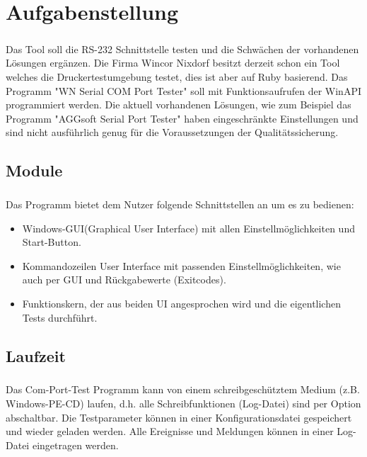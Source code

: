 
\chapter{Aufgabenstellung}\label{chp:aufgabenstellung}
\paragraph{}
Das Tool soll die RS-232 Schnittstelle testen und die Schwächen der vorhandenen Lösungen ergänzen. Die Firma Wincor Nixdorf besitzt derzeit schon ein Tool welches die Druckertestumgebung testet, dies ist aber auf Ruby basierend. Das Programm "WN Serial COM Port Tester" soll mit Funktionsaufrufen der WinAPI programmiert werden. Die aktuell vorhandenen Lösungen, wie zum Beispiel das Programm "AGGsoft Serial Port Tester" haben eingeschränkte Einstellungen und sind nicht ausführlich genug für die Voraussetzungen der Qualitätssicherung.

\section{Module}
\paragraph{}
Das Programm bietet dem Nutzer folgende Schnittstellen an um es zu bedienen:
\begin{itemize}
\item Windows-GUI(Graphical User Interface) mit allen Einstellmöglichkeiten und Start-Button.
\item Kommandozeilen User Interface mit passenden Einstellmöglichkeiten, wie auch per GUI und Rückgabewerte (Exitcodes).
\item Funktionskern, der aus beiden UI angesprochen wird und die eigentlichen Tests durchführt.
\end{itemize}


\section{Laufzeit}
\paragraph{}
Das Com-Port-Test Programm kann von einem schreibgeschütztem Medium (z.B. Windows-PE-CD) laufen, d.h. alle Schreibfunktionen (Log-Datei) sind per Option abschaltbar. Die Testparameter können in einer Konfigurationsdatei gespeichert und wieder geladen werden. Alle Ereignisse und Meldungen können in einer Log-Datei eingetragen werden. 


